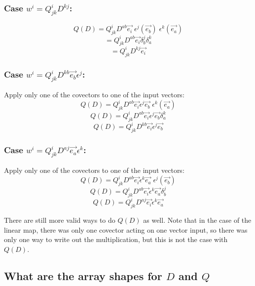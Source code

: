 \documentclass{report}
\begin{document}
\subsubsection{Case $w^i = Q_{jk}^i D^{kj}$:}
$$ Q(D) = Q_{jk}^i D^{ab} \vec{e_i} \; \epsilon^j \left(\vec{e_b}   \right) \; \epsilon^k \left( \vec{e_a} \right) $$ 
$$ = Q_{jk}^i D^{ab} \vec{e_i} \delta_b^j \delta_a^k $$ 
$$ = Q_{jk}^i D^{kj} \vec{e_i} $$ 

\subsubsection{Case $w^i = Q_{jk}^i D^{kb} \vec{e_b} \epsilon^j$:}
Apply only one of the covectors to one of the input vectors:
$$ Q(D) = Q_{jk}^i D^{ab} \vec{e_i} \epsilon^j  \vec{e_b} \; \epsilon^k \left(\vec{e_a}   \right)  $$ 
$$ Q(D) = Q_{jk}^i D^{ab} \vec{e_i} \epsilon^j  \vec{e_b} \delta_a^k  $$ 
$$ Q(D) = Q_{jk}^i D^{kb} \vec{e_i} \epsilon^j  \vec{e_b} $$ 

\subsubsection{Case $w^i = Q_{jk}^i D^{aj} \vec{e_a} \epsilon^k$:}
Apply only one of the covectors to one of the input vectors:
$$ Q(D) = Q_{jk}^i D^{ab} \vec{e_i} \epsilon^k  \vec{e_a} \; \epsilon^j \left(\vec{e_b}   \right)  $$ 
$$ Q(D) = Q_{jk}^i D^{ab} \vec{e_i} \epsilon^k  \vec{e_a} \delta_b^j   $$ 
$$ Q(D) = Q_{jk}^i D^{aj} \vec{e_i} \epsilon^k  \vec{e_a} $$ 

There are still more valid ways to do $Q(D)$ as well. Note that in the case of the linear map, there was only one covector acting on one vector input, so there was only one way to write out the multiplication, but this is not the case with $Q(D)$.

\subsection{What are the array shapes for $D$ and $Q$}
\end{document}

